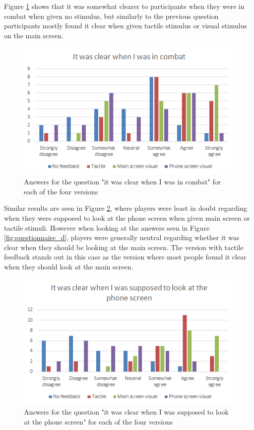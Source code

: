 Figure \ref{fig:questionnaire_b} shows that it was somewhat clearer to participants when they were in combat when given no stimulus, but similarly to the previous question participants mostly found it clear when given tactile stimulus or visual stimulus on the main screen.

\begin{figure}[h!]
	\centering
	\includegraphics[scale=1]{figures/questionnaire_b.png}
	\caption{Answers for the question "it was clear when I was in combat" for each of the four versions}\label{fig:questionnaire_b}
\end{figure}

Similar results are seen in Figure \ref{fig:questionnaire_c}, where players were least in doubt regarding when they were supposed to look at the phone screen when given main screen or tactile stimuli. However when looking at the answers seen in Figure \ref{fig:questionnaire_d}, players were generally neutral regarding whether it was clear when they should be looking at the main screen. The version with tactile feedback stands out in this case as the version where most people found it clear when they should look at the main screen.

\begin{figure}[h!]
	\centering
	\includegraphics[scale=1]{figures/questionnaire_c.png}
	\caption{Answers for the question "it was clear when I was supposed to look at the phone screen" for each of the four versions}\label{fig:questionnaire_c}
\end{figure}

